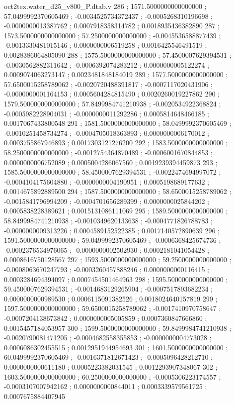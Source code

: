 \begin{filecontents}[overwrite]{oct2tex.water_d25_v800_P.dtab.v}
286 ; 1571.5000000000000000 ; 57.0499992370605469 ; -0.0034525734372437 ; -0.0005268310196698 ; -0.0000000013387762 ; 0.0007918358314782 ; 0.0018935436382890
287 ; 1573.5000000000000000 ; 57.2500000000000000 ; -0.0045536588877439 ; -0.0013330481015146 ; 0.0000000006519258 ; 0.0016425546491519 ; 0.0028386064805090
288 ; 1575.5000000000000000 ; 57.4500007629394531 ; -0.0030562882311642 ; -0.0006392074283212 ; 0.0000000005122274 ; 0.0009074063273147 ; 0.0023481848184019
289 ; 1577.5000000000000000 ; 57.6500015258789062 ; -0.0020720488391817 ; -0.0007117020431906 ; -0.0000000001164153 ; 0.0005604284815490 ; 0.0020260019227862
290 ; 1579.5000000000000000 ; 57.8499984741210938 ; -0.0020534922368824 ; -0.0005982228904031 ; -0.0000000011292286 ; 0.0005814648466185 ; 0.0017067433800548
291 ; 1581.5000000000000000 ; 58.0499992370605469 ; -0.0010251458734274 ; -0.0004705018363893 ; 0.0000000006170012 ; 0.0003755867946893 ; 0.0017303121276200
292 ; 1583.5000000000000000 ; 58.2500000000000000 ; -0.0012754364870489 ; -0.0006001670844853 ; 0.0000000006752089 ; 0.0005004286067560 ; 0.0019239394459873
293 ; 1585.5000000000000000 ; 58.4500007629394531 ; -0.0022474694997072 ; -0.0004104175604880 ; -0.0000000004190951 ; 0.0005198689177632 ; 0.0014675892889500
294 ; 1587.5000000000000000 ; 58.6500015258789062 ; -0.0015841796994209 ; -0.0004701656289399 ; 0.0000000025844202 ; 0.0005838228389621 ; 0.0015131086111069
295 ; 1589.5000000000000000 ; 58.8499984741210938 ; -0.0010349620133638 ; -0.0004771826788783 ; -0.0000000009313226 ; 0.0004589152522385 ; 0.0017140572890639
296 ; 1591.5000000000000000 ; 59.0499992370605469 ; -0.0006368425674736 ; -0.0002376534976065 ; -0.0000000002502930 ; 0.0002181041054428 ; 0.0008616750128567
297 ; 1593.5000000000000000 ; 59.2500000000000000 ; -0.0008063670247793 ; -0.0003260457888246 ; 0.0000000000116415 ; 0.0003284694394097 ; 0.0007454501464963
298 ; 1595.5000000000000000 ; 59.4500007629394531 ; -0.0014683129265904 ; -0.0007517893682234 ; 0.0000000000989530 ; 0.0006115091382526 ; 0.0018024640157819
299 ; 1597.5000000000000000 ; 59.6500015258789062 ; -0.0017410970758647 ; -0.0007204138673842 ; 0.0000000005005859 ; 0.0007360847666860 ; 0.0015457184053957
300 ; 1599.5000000000000000 ; 59.8499984741210938 ; -0.0020790081471205 ; -0.0004682558355853 ; -0.0000000004773028 ; 0.0006086302455515 ; 0.0012951944954693
301 ; 1601.5000000000000000 ; 60.0499992370605469 ; -0.0016371812671423 ; -0.0005096428212710 ; 0.0000000000611180 ; 0.0005223382031545 ; 0.0012293907348067
302 ; 1603.5000000000000000 ; 60.2500000000000000 ; -0.0005306223174557 ; -0.0003107007942162 ; 0.0000000000844011 ; 0.0003339579561725 ; 0.0007675884407945

\end{filecontents}
